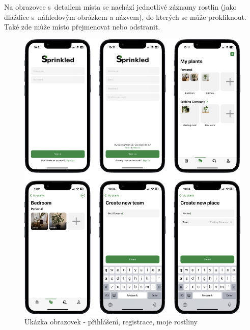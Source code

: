 \documentclass[thesis=M,czech]{FITthesis}[2019/12/23]
\begin{document}
Na obrazovce s~detailem místa se nachází jednotlivé záznamy rostlin (jako dlaždice s~náhledovým obrázkem a názvem), do kterých se může prokliknout. Také zde může místo přejmenovat nebo odstranit.

\begin{figure}
	\centering
	\includegraphics[width=1\linewidth]{images/screenshots-2.png}
  	\caption{Ukázka obrazovek - přihlášení, registrace, moje rostliny}
  	\label{img:screenshots-2}
\end{figure}
\end{document}
